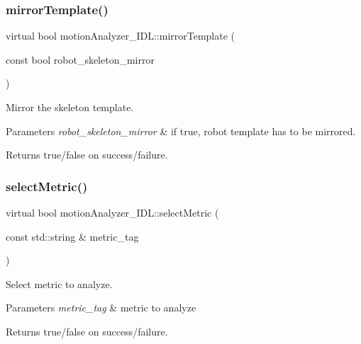 \subsubsection{\texorpdfstring{mirrorTemplate()}{mirrorTemplate()}}
{\footnotesize\ttfamily virtual bool motion\+Analyzer\+\_\+\+I\+D\+L\+::mirror\+Template (\begin{DoxyParamCaption}\item[{const bool}]{robot\+\_\+skeleton\+\_\+mirror }\end{DoxyParamCaption})\hspace{0.3cm}{\ttfamily [virtual]}}



Mirror the skeleton template. 


\begin{DoxyParams}{Parameters}
{\em robot\+\_\+skeleton\+\_\+mirror} & if true, robot template has to be mirrored. \\
\hline
\end{DoxyParams}
\begin{DoxyReturn}{Returns}
true/false on success/failure. 
\end{DoxyReturn}
\mbox{\label{classmotionAnalyzer__IDL_a7e166c4cc32ecf37cf1a3e0235e0bb4d}} 
\subsubsection{\texorpdfstring{selectMetric()}{selectMetric()}}
{\footnotesize\ttfamily virtual bool motion\+Analyzer\+\_\+\+I\+D\+L\+::select\+Metric (\begin{DoxyParamCaption}\item[{const std\+::string \&}]{metric\+\_\+tag }\end{DoxyParamCaption})\hspace{0.3cm}{\ttfamily [virtual]}}



Select metric to analyze. 


\begin{DoxyParams}{Parameters}
{\em metric\+\_\+tag} & metric to analyze \\
\hline
\end{DoxyParams}
\begin{DoxyReturn}{Returns}
true/false on success/failure. 
\end{DoxyReturn}
\mbox{\label{classmotionAnalyzer__IDL_a964bfaa136ee53f793260747531a9cb2}} 
